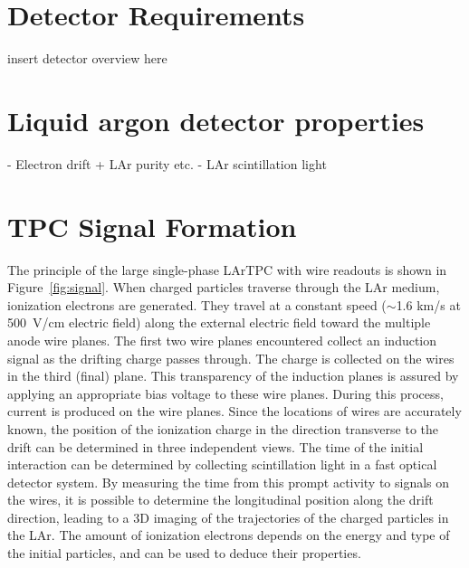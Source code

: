 
\section{Detector Requirements}

insert detector overview here 

\section{Liquid argon detector properties}
- Electron drift + LAr purity etc.
- LAr scintillation light 

\section{TPC Signal Formation}\label{sec:tpc_signal_formation}


The principle of the large single-phase LArTPC with wire readouts is shown in 
Figure~\ref{fig:signal}. When charged particles traverse through the LAr medium,
ionization electrons are generated. They %
travel at a constant speed 
($\sim$1.6 km/s at 500~V/cm electric field) along the external electric field 
toward the multiple anode wire planes. The first two wire planes encountered collect 
an induction signal as the drifting charge passes through.  The charge is collected 
on the wires in the third (final) plane. This transparency of the induction planes is assured by 
applying an appropriate bias voltage to these wire planes. During this process, 
current is produced on the wire planes. Since the locations of wires are 
accurately known, the position of the ionization charge in the direction 
transverse to the drift can be determined in three independent views. The time 
of the initial interaction can be determined by collecting scintillation light 
in a fast optical detector system. By measuring the time from this prompt activity 
to signals on the wires, it is possible to determine the longitudinal position 
along the drift direction, leading to %
a 3D imaging of the trajectories 
of the charged particles in the LAr. The amount of ionization electrons depends on 
the energy and type of the initial particles, and can be used to deduce their properties.

